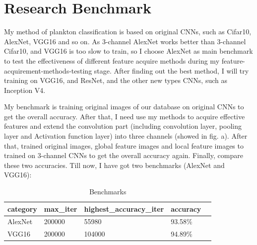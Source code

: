 \documentclass{article}
\begin{document}
\section{Research Benchmark}
My method of plankton classification is based on original CNNs, such as Cifar10, AlexNet, VGG16 and so on.  As 3-channel AlexNet works better than 3-channel Cifar10, and VGG16 is too slow to train, so I choose AlexNet as main benchmark to test the effectiveness of different feature acquire methods during my feature-acquirement-methods-testing stage. After finding out the best method, I will try training on VGG16, and ResNet, and the other new types CNNs, such as Inception V4.
\begin{figure}[!ht] 
  \centering 
  \hspace{0.3in} 
\end{figure}

My benchmark is training original images of our database on original CNNs to get the overall accuracy. After that, I need use my methods to acquire effective features and extend the convolution part (including convolution layer, pooling layer and Activation function layer) into three channels (showed in fig. a). After that, trained original images, global feature images and local feature images to trained on 3-channel CNNs to get the overall accuracy again. Finally, compare these two accuracies. Till now, I have got two benchmarks (AlexNet and VGG16):
\begin{table}[!ht]
  \caption{Benchmarks}
  \centering
  \begin{tabular}{lllll}
    \toprule
    \cmidrule{1-3}
    category     &max\_iter      &highest\_accuracy\_iter    &accuracy\\
    \midrule
    AlexNet &200000   &55980 &93.58\% \\ \hline
    VGG16 &200000   &104000 &94.89\%   \\
    \bottomrule
  \end{tabular}
\end{table}
\end{document}

